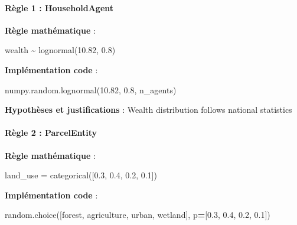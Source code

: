 \documentclass[
]{article}
\newenvironment{Shaded}{\begin{snugshade}}{\end{snugshade}}
\newcommand{\FloatTok}[1]{\textcolor[rgb]{0.00,0.00,0.81}{#1}}
\newcommand{\NormalTok}[1]{#1}
\newcommand{\OperatorTok}[1]{\textcolor[rgb]{0.81,0.36,0.00}{\textbf{#1}}}
\newcommand{\StringTok}[1]{\textcolor[rgb]{0.31,0.60,0.02}{#1}}
\begin{document}
\paragraph{Règle 1 : HouseholdAgent}\label{ruxe8gle-1-householdagent}

\textbf{Règle mathématique} :

\begin{Shaded}
\begin{Highlighting}[]
\NormalTok{wealth \textasciitilde{} lognormal(10.82, 0.8)}
\end{Highlighting}
\end{Shaded}

\textbf{Implémentation code} :

\begin{Shaded}
\begin{Highlighting}[]
\NormalTok{numpy.random.lognormal(}\FloatTok{10.82}\NormalTok{, }\FloatTok{0.8}\NormalTok{, n\_agents)}
\end{Highlighting}
\end{Shaded}

\textbf{Hypothèses et justifications} : Wealth distribution follows
national statistics

\paragraph{Règle 2 : ParcelEntity}\label{ruxe8gle-2-parcelentity}

\textbf{Règle mathématique} :

\begin{Shaded}
\begin{Highlighting}[]
\NormalTok{land\_use = categorical([0.3, 0.4, 0.2, 0.1])}
\end{Highlighting}
\end{Shaded}

\textbf{Implémentation code} :

\begin{Shaded}
\begin{Highlighting}[]
\NormalTok{random.choice([}\StringTok{\textquotesingle{}forest\textquotesingle{}}\NormalTok{, }\StringTok{\textquotesingle{}agriculture\textquotesingle{}}\NormalTok{, }\StringTok{\textquotesingle{}urban\textquotesingle{}}\NormalTok{, }\StringTok{\textquotesingle{}wetland\textquotesingle{}}\NormalTok{], p}\OperatorTok{=}\NormalTok{[}\FloatTok{0.3}\NormalTok{, }\FloatTok{0.4}\NormalTok{, }\FloatTok{0.2}\NormalTok{, }\FloatTok{0.1}\NormalTok{])}
\end{Highlighting}
\end{Shaded}
\end{document}
